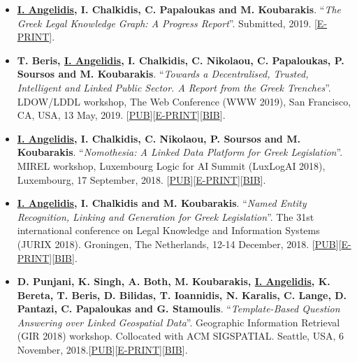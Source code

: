 \documentclass[a4paper,oneside,11pt]{article}
\begin{document}
\begin{itemize}

\item \textbf{\underline{I. Angelidis}, I. Chalkidis, C. Papaloukas and M. Koubarakis}. ``\textit{The Greek Legal Knowledge Graph: A Progress Report}''. Submitted, 2019. [\href{https://iosang.github.io/documents/Publications/2019/ISWC2019_Resources_126.pdf}{E-PRINT}].

\item \textbf{T. Beris, \underline{I. Angelidis}, I. Chalkidis, C. Nikolaou, C. Papaloukas, P. Soursos and M. Koubarakis}. ``\textit{Towards a Decentralised, Trusted, Intelligent and Linked Public Sector. A Report from the Greek Trenches}''. LDOW/LDDL workshop, The Web Conference (WWW 2019), San Francisco, CA, USA, 13 May, 2019. [\href{https://dl.acm.org/citation.cfm?doid=3308560.3317077}{PUB}][\href{https://iosang.github.io/documents/Publications/2019/www19companion-206.pdf}{E-PRINT}][\href{https://iosang.github.io/documents/Publications/2019/3317077.bib}{BIB}].

\item \textbf{\underline{I. Angelidis}, I. Chalkidis, C. Nikolaou, P. Soursos and M. Koubarakis}. ``\textit{Nomothesia: A Linked Data Platform for Greek Legislation}''. MIREL workshop, Luxembourg Logic for AI Summit (LuxLogAI 2018), Luxembourg, 17 September, 2018. [\href{https://ora.ox.ac.uk/objects/uuid:b19c1428-49db-402b-8afd-b8cf588e147d}{PUB}][\href{https://iosang.github.io/documents/Publications/2018/nomothesia-linked-data.pdf}{E-PRINT}][\href{https://ora.ox.ac.uk/objects/uuid:b19c1428-49db-402b-8afd-b8cf588e147d/export_record.bibtex}{BIB}].

\item \textbf{\underline{I. Angelidis}, I. Chalkidis and M. Koubarakis}. ``\textit{Named Entity Recognition, Linking and Generation for Greek Legislation}''. The 31st international conference on Legal Knowledge and Information Systems (JURIX 2018). Groningen, The Netherlands, 12-14 December‚ 2018. [\href{https://doi.org/10.3233/978-1-61499-935-5-1}{PUB}][\href{https://iosang.github.io/documents/Publications/2018/jurix2018.pdf}{E-PRINT}][\href{https://dblp.uni-trier.de/rec/bib1/conf/jurix/AngelidisCK18.bib}{BIB}].

\item \textbf{D. Punjani, K. Singh, A. Both, M. Koubarakis, \underline{I. Angelidis}, K. Bereta, T. Beris, D. Bilidas, T. Ioannidis, N. Karalis, C. Lange, D. Pantazi, C. Papaloukas and G. Stamoulis}. ``\textit{Template-Based Question Answering over Linked Geospatial Data}''. Geographic Information Retrieval (GIR 2018) workshop. Collocated with ACM SIGSPATIAL. Seattle, USA, 6 November, 2018.[\href{https://doi.org/10.1145/3281354.3281362}{PUB}][\href{https://iosang.github.io/documents/Publications/2018/template-based-GeoQA.pdf}{E-PRINT}][\href{https://dl.acm.org/downformats.cfm?id=3281362&parent_id=3281354&expformat=bibtex}{BIB}].


\end{itemize}
\end{document}

